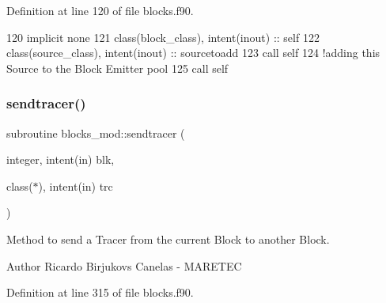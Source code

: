 Definition at line 120 of file blocks.\+f90.


\begin{DoxyCode}
120     \textcolor{keywordtype}{implicit none}
121     \textcolor{keywordtype}{class}(block\_class), \textcolor{keywordtype}{intent(inout)} :: self
122     \textcolor{keywordtype}{class}(source\_class), \textcolor{keywordtype}{intent(inout)} :: sourcetoadd
123     \textcolor{keyword}{call }self%
124     \textcolor{comment}{!adding this Source to the Block Emitter pool}
125     \textcolor{keyword}{call }self%
\end{DoxyCode}
\mbox{\label{namespaceblocks__mod_a5a9992de40470e417ec8e40e688f6a0e}} 
\subsubsection{\texorpdfstring{sendtracer()}{sendtracer()}}
{\footnotesize\ttfamily subroutine blocks\+\_\+mod\+::sendtracer (\begin{DoxyParamCaption}\item[{integer, intent(in)}]{blk,  }\item[{class($\ast$), intent(in)}]{trc }\end{DoxyParamCaption})\hspace{0.3cm}{\ttfamily [private]}}



Method to send a Tracer from the current Block to another Block. 

\begin{DoxyAuthor}{Author}
Ricardo Birjukovs Canelas -\/ M\+A\+R\+E\+T\+EC 
\end{DoxyAuthor}


Definition at line 315 of file blocks.\+f90.


